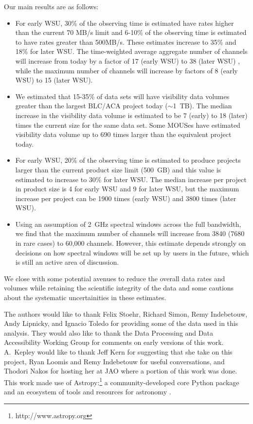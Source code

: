 \documentclass[preprint]{aastex631}
\begin{document}
Our main results are as follows:
\begin{itemize}
    \item For early WSU, 30\% of the observing time is estimated have rates higher than the current 70 MB/s limit and 6-10\% of the observing time is estimated to have rates greater than 500MB/s. These estimates increase to 35\% and 18\% for later WSU. The time-weighted average aggregate number of channels will increase from today by a factor of 17 (early WSU) to 38 (later WSU) , while the maximum number of channels will increase by factors of 8 (early WSU) to 15 (later WSU).
    \item We estimated that 15-35\% of data sets will have visibility data volumes greater than the largest BLC/ACA project today ($\sim$1~TB). The median increase  in the visibility data volume is estimated to be 7 (early) to 18 (later) times the current size for the same data set. Some MOUSes have estimated visibility data volume up to 690 times larger than the equivalent project today. 
    \item For early WSU, 20\% of the observing time is estimated to produce projects larger than the current product size limit (500~GB) and this value is estimated to increase to 30\% for later WSU. The median increase per project in product size is 4 for early WSU and 9 for later WSU, but the maximum increase per project can be 1900 times (early WSU) and 3800 times (later WSU).
    \item Using an assumption of 2~GHz spectral windows across the full bandwidth, we find that the maximum number of channels will increase from 3840 (7680 in rare cases) to 60,000 channels. However, this estimate depends strongly on decisions on how spectral windows will be set up by users in the future, which is still an active area of discussion.

\end{itemize}

We close with some potential avenues to reduce the overall data rates and volumes while retaining the scientific integrity of the data and some cautions about the systematic uncertainities in these estimates.

\vspace{10ex}

The authors would like to thank Felix Stoehr, Richard Simon, Remy Indebetouw, Andy Lipnicky, and Ignacio Toledo for providing some of the data used in this analysis. They would also like to thank the Data Processing and Data Accessibility Working Group for comments on early versions of this work. A.\ Kepley would like to thank Jeff Kern for suggesting that she take on this project, Ryan Loomis and Remy Indebetouw for useful conversations, and Thodori Nakos for hosting her at JAO where a portion of this work was done. This work made use of Astropy:\footnote{http://www.astropy.org} a community-developed core Python package and an ecosystem of tools and resources for astronomy \citep{astropy:2013, astropy:2018, astropy:2022}.
\end{document}

